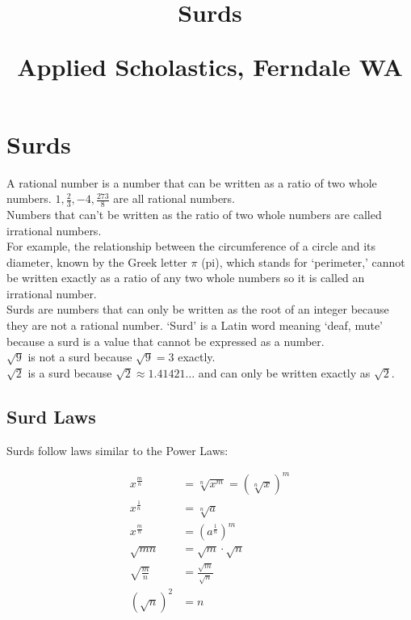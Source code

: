 \documentclass{article}
\author{}
\date{}
\title{Surds\\
\vspace{28pt}
\begin{normalsize}Applied Scholastics, Ferndale WA \end{normalsize}}
\begin{document}
\maketitle
\pagebreak

\section*{Surds}


A rational number is a number that can be written as a ratio of two whole numbers. $1, \frac{2}{3}, -4, \frac{273}{8}$ are all rational numbers.\\

Numbers that can’t be written as the ratio of two whole numbers are called irrational numbers.\\

For example, the relationship between the circumference of a circle and its diameter, known by the Greek letter $\pi$ (pi), which stands for ‘perimeter,’ cannot be written exactly as a ratio of any two whole numbers so it is called an irrational number.\\

Surds are numbers that can only be written as the root of an integer because they are not a rational number. ‘Surd’ is a Latin word meaning ‘deaf, mute’ because a surd is a value that cannot be expressed as a number.\\

$\sqrt{9}$ is not a surd because $\sqrt{9}=3$ exactly.\\

\indent $\sqrt{2}$ is a surd because $\sqrt{2}\approx 1.41421\ldots$ and can only be written exactly as $\sqrt{2}$.

\newpage

\subsection*{Surd Laws}
Surds follow laws similar to the Power Laws:
\begin{Large}
\begin{align*}
x^{\frac{m}{n}}&=\sqrt[n]{x^m}=(\sqrt[n]{x})^m\\
x^{\frac{1}{n}}&=\sqrt[n]{a}\\
x^{\frac{m}{n}}&=(a^{\frac{1}{n}})^m\\
\sqrt{ mn}&=\sqrt{m} \cdot \sqrt{n}\\
\sqrt{\frac{m}{n}}&=\frac{\sqrt{m}}{\sqrt{n}}\\
(\sqrt{n})^2&=n
\end{align*}
\end{Large}
\singlespacing
\end{document}

